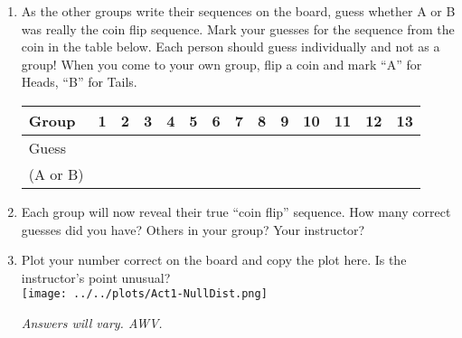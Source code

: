 \begin{enumerate}
  \item As the other groups write their sequences on the board, 
    guess whether A or B was really the coin flip sequence.  Mark
    your guesses for the sequence from the coin in the table below.
    Each person should guess individually and not as a group!  
    When you come to your own group, flip a coin and mark ``A'' for
    Heads, ``B'' for Tails.\\
    \hspace{-.4in}
    \begin{tabular}{|l|c|c|c|c|c|c|c|c|c|c|c|c|c|}
      \hline
      Group  &1   &  2  &  3  &  4  &  5  &  6  &  7  &  8  &  9  & 
      10 & 11 & 12 & 13\\
      \hline
      Guess  & \hspace{.2in} & \hspace{.2in}& \hspace{.2in}& \hspace{.2in}& \hspace{.2in}& \hspace{.2in}& \hspace{.2in}& \hspace{.2in}& \hspace{.2in}& \hspace{.2in}& \hspace{.2in}& \hspace{.2in}& \hspace{.2in}\\
(A or B)&&&&&&&&&&&&&\\
\hline
%
\hline
\end{tabular}


    \item Each group will now reveal their true ``coin flip''
      sequence.  How many correct guesses did you have? Others in your
      group?  Your instructor? \vspace{1in} 
    \item Plot your number correct on the board and copy the plot
      here. Is the instructor's point unusual?  \\
    \texttt{[image: ../../plots/Act1-NullDist.png]}
\begin{students}
  \vspace{1cm}
\end{students}    
\begin{key}
   {\it Answers will vary. AWV.}
\end{key}
 


\end{enumerate}
